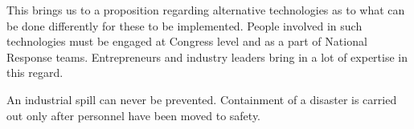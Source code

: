 \documentclass[pdftex,12pt,a4paper]{article}
\begin{document}
This brings us to a proposition regarding alternative technologies as to what can be done differently for these to be implemented. People involved in such technologies must be engaged at Congress level and as a part of National Response teams. Entrepreneurs and industry leaders bring in a lot of expertise in this regard.

An industrial spill can never be prevented. Containment of a disaster is carried out only after personnel have been moved to safety.
\end{document}
